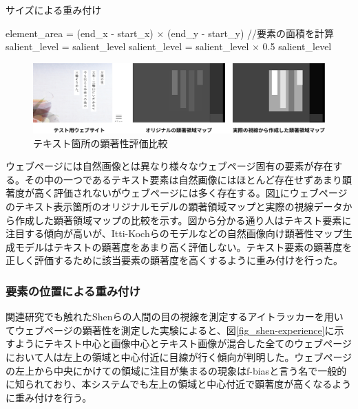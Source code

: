 \begin{algorithm}[H]
  \small
  \caption{サイズによる重み付け}
  \label{alg:weight-size}
  \begin{algorithmic}
  \State element\_area =  (end\_x - start\_x) $\times$ (end\_y - start\_y) //要素の面積を計算
    \State salient\_level = salient\_level
  \Else
    \State salient\_level = salient\_level $\times$ 0.5
  \EndIf
  \State \Return salient\_level
  \EndFunction
  \end{algorithmic}
\end{algorithm}

\begin{figure}[H]
  \centering
  \includegraphics[width=12cm]{figures/06_textbias.jpg}
  \caption{テキスト箇所の顕著性評価比較}
  \label{fig_textbias}
\end{figure}

\par ウェブページには自然画像とは異なり様々なウェブページ固有の要素が存在する。その中の一つであるテキスト要素は自然画像にはほとんど存在せずあまり顕著度が高く評価されないがウェブページには多く存在する。図\ref{fig_textbias}にウェブページのテキスト表示箇所のオリジナルモデルの顕著領域マップと実際の視線データから作成した顕著領域マップの比較を示す。図から分かる通り人はテキスト要素に注目する傾向が高いが、Itti-Kochらのモデルなどの自然画像向け顕著性マップ生成モデルはテキストの顕著度をあまり高く評価しない。テキスト要素の顕著度を正しく評価するために該当要素の顕著度を高くするように重み付けを行った。


\subsubsection{要素の位置による重み付け}\label{subsec:system03-2}
\par 関連研究でも触れたShenらの人間の目の視線を測定するアイトラッカーを用いてウェブページの顕著性を測定した実験によると、図\ref{fig_shen-experience}に示すようにテキスト中心と画像中心とテキスト画像が混合した全てのウェブページにおいて人は左上の領域と中心付近に目線が行く傾向が判明した。ウェブページの左上から中央にかけての領域に注目が集まるの現象はf-biasと言う名で一般的に知られており、本システムでも左上の領域と中心付近で顕著度が高くなるように重み付けを行う。


